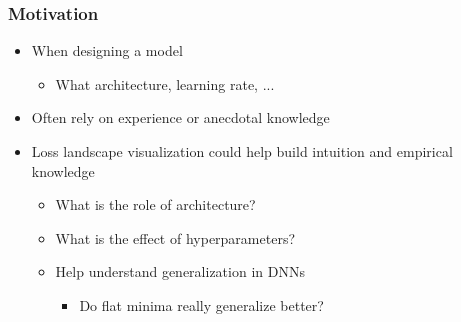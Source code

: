 \documentclass[9pt]{beamer}
\begin{document}
\begin{frame}
\frametitle{Motivation}
\begin{itemize}%
	\item When designing a model
	\begin{itemize}
		\item What architecture, learning rate, ...
	\end{itemize}
	\item Often rely on experience or anecdotal knowledge
	\item Loss landscape visualization could help build intuition and empirical knowledge
	\begin{itemize}
		\item What is the role of architecture?
		\item What is the effect of hyperparameters?
			\item Help understand generalization in DNNs
			\begin{itemize}
						\item Do flat minima really generalize better?
			\end{itemize}
	\end{itemize}
\end{itemize}
\end{frame} 
\end{document}

